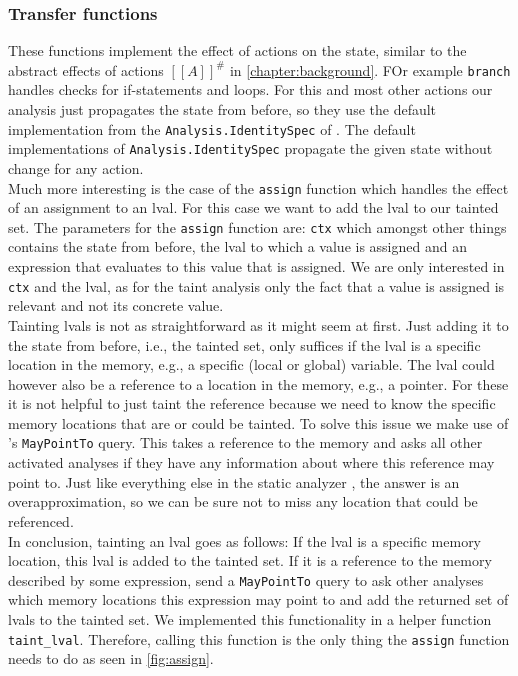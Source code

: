       \subsubsection{Transfer functions}
        These functions implement the effect of actions on the state, similar to the abstract effects of actions $[\![A]\!]^{\#}$ in \autoref{chapter:background}. FOr example \texttt{branch} handles checks for if-statements and loops. For this and most other actions our analysis just propagates the state from before, so they use the default implementation from the \texttt{Analysis.IdentitySpec} of \gob. The default implementations of \texttt{Analysis.IdentitySpec} propagate the given state without change for any action.\\
        Much more interesting is the case of the \texttt{assign} function which handles the effect of an assignment to an \ac{lval}. For this case we want to add the \ac{lval} to our tainted set. The parameters for the \texttt{assign} function are: \texttt{ctx} which amongst other things contains the state from before, the \ac{lval} to which a value is assigned and an expression that evaluates to this value that is assigned. We are only interested in \texttt{ctx} and the \ac{lval}, as for the taint analysis only the fact that a value is assigned is relevant and not its concrete value.\\
        Tainting \ac{lval}s is not as straightforward as it might seem at first. Just adding it to the state from before, i.e., the tainted set, only suffices if the \ac{lval} is a specific location in the memory, e.g., a specific (local or global) variable. The \ac{lval} could however also be a reference to a location in the memory, e.g., a pointer. For these it is not helpful to just taint the reference because we need to know the specific memory locations that are or could be tainted. To solve this issue we make use of \gob's \texttt{MayPointTo} query. This takes a reference to the memory and asks all other activated analyses if they have any information about where this reference may point to. Just like everything else in the static analyzer \gob, the answer is an overapproximation, so we can be sure not to miss any location that could be referenced.\\
        In conclusion, tainting an \ac{lval} goes as follows: If the \ac{lval} is a specific memory location, this \ac{lval} is added to the tainted set. If it is a reference to the memory described by some expression, send a \texttt{MayPointTo} query to ask other analyses which memory locations this expression may point to and add the returned set of \ac{lval}s to the tainted set. We implemented this functionality in a helper function \texttt{taint\_lval}. Therefore, calling this function is the only thing the \texttt{assign} function needs to do as seen in \autoref{fig:assign}.

